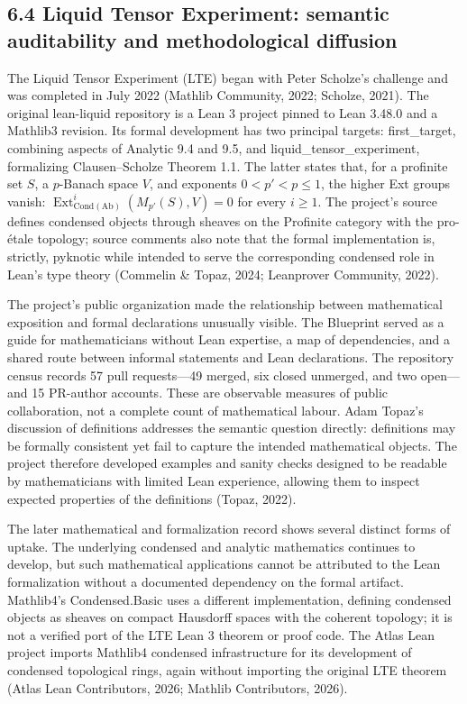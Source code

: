 \documentclass[sn-apa]{sn-jnl}
\begin{document}
\subsection{6.4 Liquid Tensor Experiment: semantic auditability and methodological diffusion}

The Liquid Tensor Experiment (LTE) began with Peter Scholze’s challenge and was completed in July 2022 (Mathlib Community, 2022; Scholze, 2021). The original lean-liquid repository is a Lean 3 project pinned to Lean 3.48.0 and a Mathlib3 revision. Its formal development has two principal targets: first\_target, combining aspects of Analytic 9.4 and 9.5, and liquid\_tensor\_experiment, formalizing Clausen–Scholze Theorem 1.1. The latter states that, for a profinite set \(S\), a \(p\)-Banach space \(V\), and exponents \(0<p'<p\leq1\), the higher Ext groups vanish: \(\operatorname{Ext}^{i}_{\mathrm{Cond}(\mathrm{Ab})}(M_{p'}(S),V)=0\) for every \(i\geq1\). The project’s source defines condensed objects through sheaves on the Profinite category with the pro-étale topology; source comments also note that the formal implementation is, strictly, pyknotic while intended to serve the corresponding condensed role in Lean’s type theory (Commelin \& Topaz, 2024; Leanprover Community, 2022).

The project’s public organization made the relationship between mathematical exposition and formal declarations unusually visible. The Blueprint served as a guide for mathematicians without Lean expertise, a map of dependencies, and a shared route between informal statements and Lean declarations. The repository census records 57 pull requests—49 merged, six closed unmerged, and two open—and 15 PR-author accounts. These are observable measures of public collaboration, not a complete count of mathematical labour. Adam Topaz’s discussion of definitions addresses the semantic question directly: definitions may be formally consistent yet fail to capture the intended mathematical objects. The project therefore developed examples and sanity checks designed to be readable by mathematicians with limited Lean experience, allowing them to inspect expected properties of the definitions (Topaz, 2022).

The later mathematical and formalization record shows several distinct forms of uptake. The underlying condensed and analytic mathematics continues to develop, but such mathematical applications cannot be attributed to the Lean formalization without a documented dependency on the formal artifact. Mathlib4’s Condensed.Basic uses a different implementation, defining condensed objects as sheaves on compact Hausdorff spaces with the coherent topology; it is not a verified port of the LTE Lean 3 theorem or proof code. The Atlas Lean project imports Mathlib4 condensed infrastructure for its development of condensed topological rings, again without importing the original LTE theorem (Atlas Lean Contributors, 2026; Mathlib Contributors, 2026).
\end{document}
